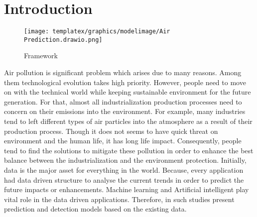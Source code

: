 \section{Introduction}\label{sec-intro}







\begin{figure*}
\centering
\texttt{[image: templatex/graphics/modelimage/Air Prediction.drawio.png]}
\caption{Framework }
\label{Fig_FLStructure}
\end{figure*}

Air pollution is significant problem which arises due to many reasons.
Among them technological evolution takes high priority.
However, people need to move on with the technical world 
while keeping sustainable environment for the future generation.
For that, almost all industrialization production processes need 
to concern on their emissions into the environment.
For example, many industries tend to left different types of air 
particles into the atmosphere as a result of their production process.
Though it does not seems to have quick threat on environment and the human life,
it has long life impact. Consequently, people tend to find the solutions to 
mitigate these pollution in order to enhance the best balance between 
the industrialization and the environment protection. 
Initially, data is the major asset for everything in the world.
Because, every application had data driven structure to analyse the current trends 
in order to predict the future impacts or enhancements.
Machine learning and Artificial intelligent play vital role in the data driven applications. 
Therefore, in such studies present prediction and detection models based on the existing data.

